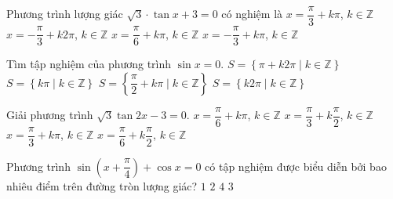 \begin{ex}%
	Phương trình lượng giác $\sqrt{3}\cdot \tan  x+3=0$ có nghiệm là
	 \choice
		{$x=\dfrac{\pi}{3}+k \pi$, $k  \in \mathbb{Z}$}
		 {$x=-\dfrac{\pi}{3}+k 2 \pi$, $k \in \mathbb{Z}$}
		{$x=\dfrac{\pi}{6}+k \pi$,  $k \in \mathbb{Z}$}
		{\True $x=-\dfrac{\pi}{3}+k \pi$, $k \in \mathbb{Z}$} 
\end{ex}

\begin{ex}%
	Tìm tập nghiệm  của phương trình $\sin x=0$.
	\choice 
		{$S=\left\lbrace \pi+k2\pi\mid  k\in\mathbb{Z}\right\rbrace$}
		{\True $S=\left\lbrace  k\pi\mid k\in\mathbb{Z}\right\rbrace $}
		{$S=\left\lbrace  \dfrac{\pi}{2}+k\pi\mid k\in\mathbb{Z}\right\rbrace $}
		{$S=\left\lbrace k2\pi\mid k\in\mathbb{Z}\right\rbrace $} 
\end{ex}

\begin{ex}%
	Giải phương trình  $\sqrt{3}\tan 2 x-3=0$.
	 \choice
		{$x=\dfrac{\pi}{6}+k \pi$, $k \in \mathbb{Z}$} 
		{$x=\dfrac{\pi}{3}+k \dfrac{\pi}{2}$,  $ k \in \mathbb{Z}$}
		{$x=\dfrac{\pi}{3}+k \pi$,  $ k \in \mathbb{Z}$}
		 {\True $x=\dfrac{\pi}{6}+k \dfrac{\pi}{2}$, $ k \in \mathbb{Z}$}
\end{ex}

\begin{ex}%
	Phương trình $\sin \left(x+\dfrac{\pi}{4} \right)+\cos x=0$ có tập nghiệm được biểu diễn bởi bao nhiêu điểm  trên đường tròn lượng giác?
	 \choice
		 {$1$}
		 {\True $2$}
		 {$4$}
		{$3$} 
\end{ex}

